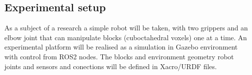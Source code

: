 



\subsection{Experimental setup}
As a subject of a research a simple robot will be taken, with two grippers 
and an elbow joint that can manipulate blocks (cuboctahedral voxels) one at a time.
An experimental platform will be realised as a simulation in Gazebo environment 
with control from ROS2 nodes. The  blocks and environment geometry robot joints 
and sensors and conections will be defined in Xacro/URDF files. 



%
%
%
%
%

